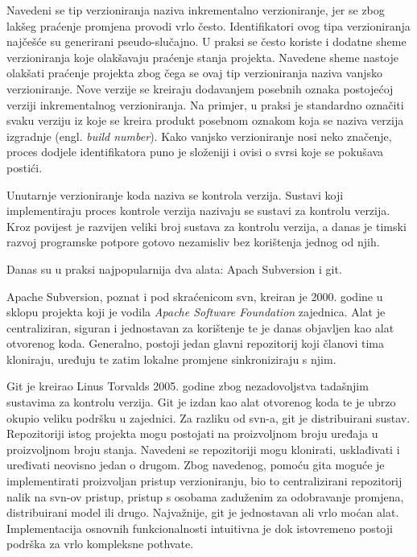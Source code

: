 \documentclass[times, utf8, diplomski, numeric]{fer}
\newcommand{\eng}[1]{(engl. \textit{#1})}
\begin{document}
Navedeni se tip verzioniranja naziva inkrementalno verzioniranje, jer se zbog lakšeg praćenje promjena provodi vrlo često. Identifikatori ovog tipa verzioniranja najčešće su generirani pseudo-slučajno. U praksi se često koriste i dodatne sheme verzioniranja koje olakšavaju praćenje stanja projekta. Navedene sheme nastoje olakšati praćenje projekta zbog čega se ovaj tip verzioniranja naziva vanjsko verzioniranje. Nove verzije se kreiraju dodavanjem posebnih oznaka postojećoj verziji inkrementalnog verzioniranja. Na primjer, u praksi je standardno označiti svaku verziju iz koje se kreira produkt posebnom oznakom koja se naziva verzija izgradnje \eng{build number}. Kako vanjsko verzioniranje nosi neko značenje, proces dodjele identifikatora puno je složeniji i ovisi o svrsi koje se pokušava postići.

Unutarnje verzioniranje koda naziva se kontrola verzija\citep{wiki:VersionControl}. Sustavi koji implementiraju proces kontrole verzija nazivaju se sustavi za kontrolu verzija. Kroz povijest je razvijen veliki broj sustava za kontrolu verzija, a danas je timski razvoj programske potpore gotovo nezamisliv bez korištenja jednog od njih.

Danas su u praksi najpopularnija dva alata: Apach Subversion i git.

Apache Subversion, poznat i pod skraćenicom svn, kreiran je 2000. godine u sklopu projekta koji je vodila \textit{Apache Software Foundation} zajednica. Alat je centraliziran, siguran i jednostavan za korištenje te je danas objavljen kao alat otvorenog koda. Generalno, postoji jedan glavni repozitorij koji članovi tima kloniraju, uređuju te zatim lokalne promjene sinkroniziraju s njim.

Git je kreirao Linus Torvalds 2005. godine zbog nezadovoljstva tadašnjim sustavima za kontrolu verzija. Git je izdan kao alat otvorenog koda te je ubrzo okupio veliku podršku u zajednici. Za razliku od svn-a, git je distribuirani sustav. Repozitoriji istog projekta mogu postojati na proizvoljnom broju uređaja u proizvoljnom broju stanja. Navedeni se repozitoriji mogu klonirati, usklađivati i uređivati neovisno jedan o drugom. Zbog navedenog, pomoću gita moguće je implementirati proizvoljan pristup verzioniranju, bio to centralizirani repozitorij nalik na svn-ov pristup, pristup s osobama zaduženim za odobravanje promjena, distribuirani model ili drugo. Najvažnije, git je jednostavan ali vrlo moćan alat. Implementacija osnovnih funkcionalnosti intuitivna je dok istovremeno postoji podrška za vrlo kompleksne pothvate.
\end{document}
